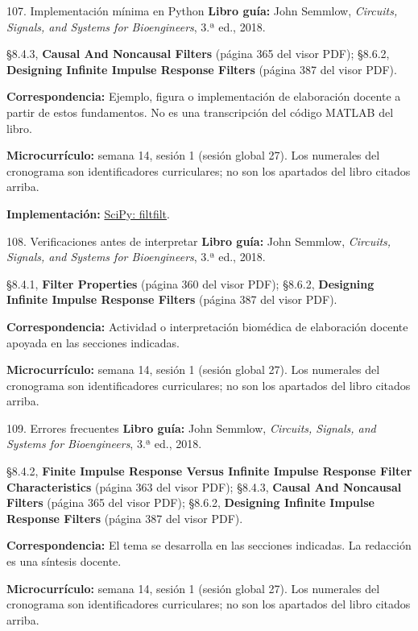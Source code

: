 \documentclass[
  10pt,
  ignorenonframetext,
  aspectratio=169,
  spanish,
]{beamer}
\begin{document}
\begin{frame}{107. Implementación mínima en Python}
\label{implementaciuxf3n-muxednima-en-python-6}
\textbf{Libro guía:} John Semmlow, \emph{Circuits, Signals, and Systems
for Bioengineers}, 3.ª ed., 2018.

§8.4.3, \textbf{Causal And Noncausal Filters} (página 365 del visor
PDF); §8.6.2, \textbf{Designing Infinite Impulse Response Filters}
(página 387 del visor PDF).

\textbf{Correspondencia:} Ejemplo, figura o implementación de
elaboración docente a partir de estos fundamentos. No es una
transcripción del código MATLAB del libro.

\textbf{Microcurrículo:} semana 14, sesión 1 (sesión global 27). Los
numerales del cronograma son identificadores curriculares; no son los
apartados del libro citados arriba.

\textbf{Implementación:}
\href{https://docs.scipy.org/doc/scipy/reference/generated/scipy.signal.filtfilt.html}{SciPy:
filtfilt}.
\end{frame}

\begin{frame}{108. Verificaciones antes de interpretar}
\label{verificaciones-antes-de-interpretar-6}
\textbf{Libro guía:} John Semmlow, \emph{Circuits, Signals, and Systems
for Bioengineers}, 3.ª ed., 2018.

§8.4.1, \textbf{Filter Properties} (página 360 del visor PDF); §8.6.2,
\textbf{Designing Infinite Impulse Response Filters} (página 387 del
visor PDF).

\textbf{Correspondencia:} Actividad o interpretación biomédica de
elaboración docente apoyada en las secciones indicadas.

\textbf{Microcurrículo:} semana 14, sesión 1 (sesión global 27). Los
numerales del cronograma son identificadores curriculares; no son los
apartados del libro citados arriba.
\end{frame}

\begin{frame}{109. Errores frecuentes}
\label{errores-frecuentes-6}
\textbf{Libro guía:} John Semmlow, \emph{Circuits, Signals, and Systems
for Bioengineers}, 3.ª ed., 2018.

§8.4.2, \textbf{Finite Impulse Response Versus Infinite Impulse Response
Filter Characteristics} (página 363 del visor PDF); §8.4.3,
\textbf{Causal And Noncausal Filters} (página 365 del visor PDF);
§8.6.2, \textbf{Designing Infinite Impulse Response Filters} (página 387
del visor PDF).

\textbf{Correspondencia:} El tema se desarrolla en las secciones
indicadas. La redacción es una síntesis docente.

\textbf{Microcurrículo:} semana 14, sesión 1 (sesión global 27). Los
numerales del cronograma son identificadores curriculares; no son los
apartados del libro citados arriba.
\end{frame}
\end{document}

